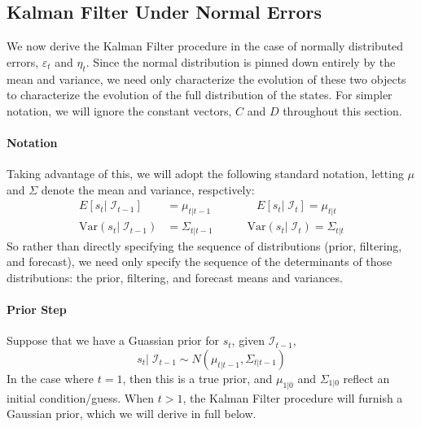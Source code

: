 \documentclass[a4paper,12pt]{article}
\begin{document}
\clearpage

\subsection{Kalman Filter Under Normal Errors}
\label{subsec:kfnormal}

We now derive the Kalman Filter procedure in the case of normally distributed errors, $\varepsilon_t$ and $\eta_t$. Since the normal distribution is pinned down entirely by the mean and variance, we need only characterize the evolution of these two objects to characterize the evolution of the full distribution of the states. For simpler notation, we will ignore the constant vectors, $C$ and $D$ throughout this section.

\paragraph{Notation}
Taking advantage of this, we will adopt the following standard notation, letting $\mu$ and $\Sigma$ denote the mean and variance, respctively: 
\begin{align*}
  E[s_t|\;\mathcal{I}_{t-1}] &= \mu_{t|t-1} 
  \qquad
  \qquad
  E[s_t|\;\mathcal{I}_{t}] = \mu_{t|t}  \\
  \text{Var}(s_t|\;\mathcal{I}_{t-1}) &= \Sigma_{t|t-1}  
  \qquad
  \quad
  \text{Var}(s_t|\;\mathcal{I}_{t}) = \Sigma_{t|t} 
\end{align*}
So rather than directly specifying the sequence of distributions (prior, filtering, and forecast), we need only specify the sequence of the determinants of those distributions: the prior, filtering, and forecast means and variances.

\paragraph{Prior Step}
Suppose that we have a Guassian prior for $s_t$, given $\mathcal{I}_{t-1}$,
\[
  s_t | \; \mathcal{I}_{t-1} 
  \sim N(\mu_{t|t-1}, \Sigma_{t|t-1})
\]
In the case where $t=1$, then this is a true prior, and $\mu_{1|0}$ and
$\Sigma_{1|0}$ reflect an initial condition/guess. When $t>1$, the
Kalman Filter procedure will furnish a Gaussian prior, which we will
derive in full below.
\end{document}
